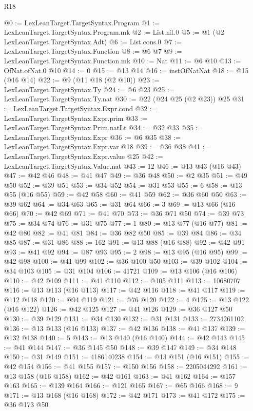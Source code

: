 \begin{lexlean}{R18}
\begin{coremodule}
@0 := LexLeanTarget.TargetSyntax.Program
@1 := LexLeanTarget.TargetSyntax.Program.mk
@2 := List.nil.{0}
@5 := @1 (@2 LexLeanTarget.TargetSyntax.Adt)
@6 := List.cons.{0}
@7 := LexLeanTarget.TargetSyntax.Function
@8 := @6 @7
@9 := LexLeanTarget.TargetSyntax.Function.mk
@10 := Nat
@11 := @6 @10
@13 := OfNat.ofNat.{0} @10
@14 := 0
@15 := @13 @14
@16 := instOfNatNat
@18 := @15 (@16 @14)
@22 := @9 (@11 @18 (@2 @10))
@23 := LexLeanTarget.TargetSyntax.Ty
@24 := @6 @23
@25 := LexLeanTarget.TargetSyntax.Ty.nat
@30 := @22 (@24 @25 (@2 @23)) @25
@31 := LexLeanTarget.TargetSyntax.Expr.cond
@32 := LexLeanTarget.TargetSyntax.Expr.prim
@33 := LexLeanTarget.TargetSyntax.Prim.natLt
@34 := @32 @33
@35 := LexLeanTarget.TargetSyntax.Expr
@36 := @6 @35
@38 := LexLeanTarget.TargetSyntax.Expr.var @18
@39 := @36 @38
@41 := LexLeanTarget.TargetSyntax.Expr.value @25
@42 := LexLeanTarget.TargetSyntax.Value.nat
@43 := 12
@46 := @13 @43 (@16 @43)
@47 := @42 @46
@48 := @41 @47
@49 := @36 @48
@50 := @2 @35
@51 := @49 @50
@52 := @39 @51
@53 := @34 @52
@54 := @31 @53
@55 := 6
@58 := @13 @55 (@16 @55)
@59 := @42 @58
@60 := @41 @59
@62 := @36 @60 @50
@63 := @39 @62
@64 := @34 @63
@65 := @31 @64
@66 := 3
@69 := @13 @66 (@16 @66)
@70 := @42 @69
@71 := @41 @70
@73 := @36 @71 @50
@74 := @39 @73
@75 := @34 @74
@76 := @31 @75
@77 := 1
@80 := @13 @77 (@16 @77)
@81 := @42 @80
@82 := @41 @81
@84 := @36 @82 @50
@85 := @39 @84
@86 := @34 @85
@87 := @31 @86
@88 := 162
@91 := @13 @88 (@16 @88)
@92 := @42 @91
@93 := @41 @92
@94 := @87 @93
@95 := 2
@98 := @13 @95 (@16 @95)
@99 := @42 @98
@100 := @41 @99
@102 := @36 @100 @50
@103 := @39 @102
@104 := @34 @103
@105 := @31 @104
@106 := 41721
@109 := @13 @106 (@16 @106)
@110 := @42 @109
@111 := @41 @110
@112 := @105 @111
@113 := 10680707
@116 := @13 @113 (@16 @113)
@117 := @42 @116
@118 := @41 @117
@119 := @112 @118
@120 := @94 @119
@121 := @76 @120
@122 := 4
@125 := @13 @122 (@16 @122)
@126 := @42 @125
@127 := @41 @126
@129 := @36 @127 @50
@130 := @39 @129
@131 := @34 @130
@132 := @31 @131
@133 := 2734261102
@136 := @13 @133 (@16 @133)
@137 := @42 @136
@138 := @41 @137
@139 := @132 @138
@140 := 5
@143 := @13 @140 (@16 @140)
@144 := @42 @143
@145 := @41 @144
@147 := @36 @145 @50
@148 := @39 @147
@149 := @34 @148
@150 := @31 @149
@151 := 4186140238
@154 := @13 @151 (@16 @151)
@155 := @42 @154
@156 := @41 @155
@157 := @150 @156
@158 := 2205044292
@161 := @13 @158 (@16 @158)
@162 := @42 @161
@163 := @41 @162
@164 := @157 @163
@165 := @139 @164
@166 := @121 @165
@167 := @65 @166
@168 := 9
@171 := @13 @168 (@16 @168)
@172 := @42 @171
@173 := @41 @172
@175 := @36 @173 @50

\end{coremodule}
\end{lexlean}
